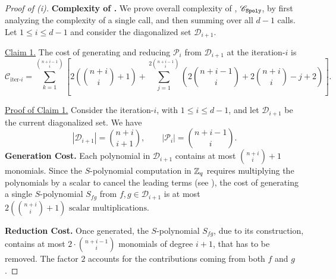 \begin{proof}[Proof of  (i)]
\textbf{Complexity of \algspoly.}
We prove overall complexity of \algspoly, $\mathscr{C}_{\texttt{Spoly}}$, by first analyzing the complexity of a single call, and then summing over all $d-1$ calls. 
Let $1 \le i \le d-1$ and consider the diagonalized set $\mathcal{D}_{i+1}$.

\underline{\textsf{Claim 1.}}
The cost of generating and reducing $\mathcal{P}_i$ from $\mathcal{D}_{i+1}$ at the iteration-$i$ is
\[
\mathscr{C}_{\text{iter-}i} = \sum_{k=1}^{\binom{n+i-1}{i}} \left[ 2\left(\binom{n+i}{i}+1\right) + \sum_{j=1}^{2\binom{n+i-1}{i}} \left( 2\binom{n+i-1}{i} + 2\binom{n+i}{i} - j + 2 \right) \right].
\]
    
\underline{\textsf{Proof of Claim 1.}}
Consider the iteration-$i$, with $1\le i \le d-1$, and let $\mathcal{D}_{i+1}$ be the current diagonalized set.
We have
\[
|\mathcal{D}_{i+1}| = \binom{n+i}{i+1}, \qquad
|\mathcal{P}_i| = \binom{n+i-1}{i}.
\]
\textbf{Generation Cost.} 
Each polynomial in $\mathcal{D}_{i+1}$ contains at most $\binom{n+i}{i}+1$ monomials. Since the $S$-polynomial computation in \(\mathbb{Z}_q\) requires multiplying the polynomials by a scalar to cancel the leading terms (see ), the cost of generating a single $S$-polynomial $S_{fg}$ from $f, g \in \mathcal{D}_{i+1}$ is at most $2\left(\binom{n+i}{i}+1\right) \text{ scalar multiplications.}$

\textbf{Reduction Cost.}
Once generated, the $S$-polynomial $S_{fg}$, due to its construction, contains at most $2\cdot\binom{n+i-1}{i}$ monomials of degree $i+1$, that has to be removed. The factor $2$ accounts for the contributions coming from both $f$ and $g$.


\end{proof}
